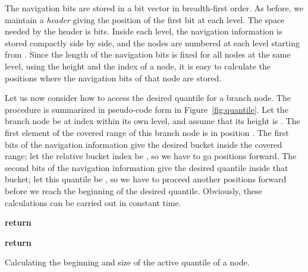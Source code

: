 \documentclass[final,onetabnum,onefignum,onethmnum]{siamltex}
\begin{document}
The navigation bits are stored in a bit vector in breadth-first order.
As before, we maintain a \emph{header} giving the position of the first bit
at each level. The space needed by the header is 
bits. Inside each level, the navigation information is stored compactly
side by side, and the nodes are numbered at each level starting from
.  Since the length of the navigation bits is fixed for all nodes
at the same level, using the height and the index of a node, it is
easy to calculate the positions where the navigation bits of that node
are stored.

Let us now consider how to access the desired quantile for a branch
node. The procedure is summarized in pseudo-code form
in Figure~\ref{fig:quantile}. Let the branch node be at index  within
its own level, and assume that its height is . The first element of
the covered range of this branch node is in position .  The first  bits of the navigation information
give the desired bucket inside the covered range; let the relative
bucket index be , so we have to
go  positions forward. The second  bits
of the navigation information give the desired quantile inside that
bucket; let this quantile be , so we have to proceed another
 positions forward before we
reach the beginning of the desired quantile. Obviously, these
calculations can be carried out in constant time.

\begin{algorithm2e}[tb!]
\SetStartEndCondition{ }{}{}
\DontPrintSemicolon
\Proc{}

\;
\; 
\If {} {
  \;
  \;
   \textbf{return} \;
}

\;

\;

\;

\;

\;

\;

\;

   \textbf{return} \;

\caption{Calculating the beginning and size of the active quantile of a node.}
\label{fig:quantile}	
\end{algorithm2e}
\end{document}
